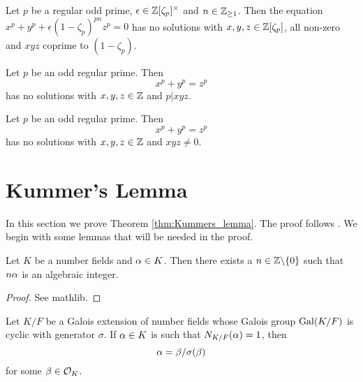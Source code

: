 \begin{theorem}\label{thm:gen_flt_eqn}
	Let $p$ be a regular odd prime, $\epsilon \in \mathbb{Z}[\zeta_p]^\times$ and $n \in \mathbb{Z}_{\geq 1}$. Then the equation $x^p+y^p+\epsilon(1-\zeta_p)^{pn}z^p=0$ has no solutions with $x,y,z \in \mathbb{Z}[\zeta_p]$, all non-zero and $xyz$ coprime to $(1-\zeta_p)$.
\end{theorem}

\begin{theorem}\label{theorem:FLT_case_two}
	\leanok
	Let $p$ be an odd regular prime. Then \[x^p+y^p=z^p\] has no solutions with $x,y,z \in \mathbb{Z}$ and $p | xyz$.
\end{theorem}


\begin{theorem}\label{FLT_regular}
	\leanok
	Let $p$ be an odd regular prime.  Then \[x^p+y^p=z^p\] has no solutions with $x,y,z \in \mathbb{Z}$ and $xyz \ne 0$.
\end{theorem}

\section{Kummer's Lemma}

In this section we prove Theorem \ref{thm:Kummers_lemma}. The proof follows \cite{SD}. We begin with some lemmas that will be needed in the proof.


\begin{lemma}\label{lem:exists_alg_int}
	\leanok
	Let $K$ be a number fields and $\alpha \in K$. Then there exists a $n \in \mathbb{Z}\backslash\{0\}$ such that $n \alpha$ is an algebraic integer.
\end{lemma}
\begin{proof}
	\leanok
	See mathlib.
\end{proof}

\begin{theorem}[Hilbert 90]\label{Hilbert90}
Let $K/F$ be a Galois extension of number fields whose Galois group $\operatorname{Gal}(K/F)$ is cyclic with generator $\sigma$. If $\alpha \in K$ is such that $N_{K/F}(\alpha)=1$, then \[ \alpha =\beta/ \sigma(\beta)\] for some $\beta \in \mathcal{O}_K$.

\end{theorem}

